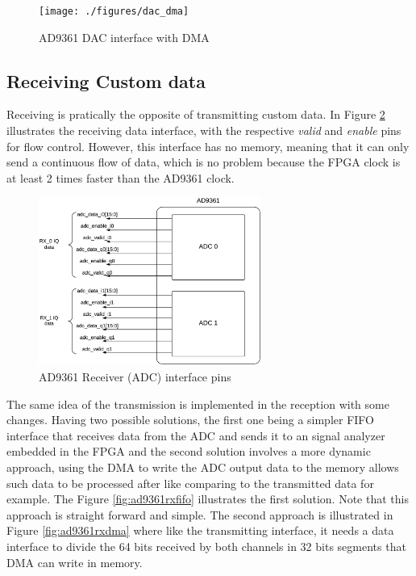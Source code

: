 
\begin{figure}[htbp]
    \centering
    \texttt{[image: ./figures/dac\_dma]}
    \caption{ AD9361 DAC interface with DMA
    \label{fig:ad9361txdma}}
\end{figure}

\subsection{Receiving Custom data}

Receiving is pratically the opposite of transmitting custom data. In Figure
\ref{fig:rxpins} illustrates the receiving data interface, with the respective
\emph{valid} and \emph{enable} pins for flow control. However, this interface
has no memory, meaning that it can only send a continuous flow of data, which is
no problem because the FPGA clock is at least 2 times faster than the AD9361
clock.

\begin{figure}[htbp]
    \centering
    \includegraphics[width=0.65\textwidth]{./figures/ad9361rx_pins}
    \caption{ AD9361 Receiver (ADC) interface pins
    \label{fig:rxpins}}
\end{figure}

The same idea of the transmission is implemented in the reception with some
changes. Having two possible solutions, the first one being a simpler FIFO
interface that receives data from the ADC and sends it to an signal analyzer
embedded in the FPGA and the second solution involves a more dynamic approach,
using the DMA to write the ADC output data to the memory allows such data to be
processed after like comparing to the transmitted data for example. The Figure
\ref{fig:ad9361rxfifo} illustrates the first solution. Note that this approach
is straight forward and simple. The second approach is illustrated in Figure
\ref{fig:ad9361rxdma} where like the transmitting interface, it needs a data
interface to divide the 64 bits received by both channels in 32 bits segments
that DMA can write in memory.


